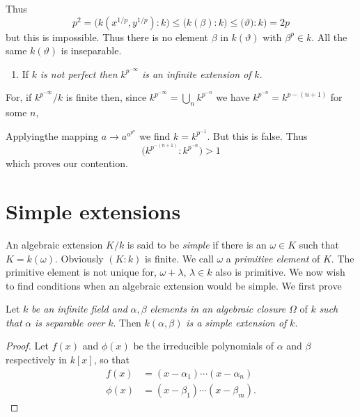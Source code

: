 Thus 
$$
p^2 = \big( k(x^{1/p} , y^{1/p}) : k \big) \le \big( k(\beta) : k \big
) \le \big(\vartheta) : k \big) = 2 p 
$$
but this is impossible. Thus there is no element $\beta$ in $k
(\vartheta)$ with $\beta^p \in k$. All the same $k(\vartheta)$ is
inseparable. 
\begin{enumerate} 
\renewcommand{\labelenumi}{\theenumi)}
\setcounter{enumi}{5}
\item If $k$ \textit {is not perfect then} $k^{p^{-\infty}}$
  \textit{is an infinite extension of} $k$. 
\end{enumerate}

For, if $k^{p^{-\infty}} / k$ is finite then, since $k^{p^{-\infty}} =
\bigcup \limits_{n}k^{p^{- n}}$ we have $k^{p^{- n }} = k^{p - (n +
  1)}$ for some $n$, 

 Applying\pageoriginale the mapping $a \rightarrow a^{a^{p^n}}$
we find $k = k^{p^{-1}}$. But this is false. Thus 
$$
\bigg( k^{p^{-(n+1)}} : k^{p^{-n}} \bigg) > 1
$$
which proves our contention.

\section{Simple extensions}\label{c2:s6}%

An algebraic extension $K/k$ is said to be \textit{simple} if there is
an $\omega \in K$ such that $K = k(\omega)$. Obviously $(K : k)$ is
finite. We call $\omega$ a \textit{primitive element} of $K$. The
primitive element is not unique for, $\omega + \lambda$, $\lambda \in
k$ also is primitive. We now wish to find conditions when an algebraic
extension would be simple. We first prove	 

\begin{lemma*}
Let $k$ {\em be an infinite field and} $\alpha , \beta$ {\em elements
  in an algebraic closure} $\Omega$ of $k$ {\em such that} $\alpha$
{\em is separable over} $k$. Then $k(\alpha , \beta)$ {\em is a simple
  extension of} $k$. 
\end{lemma*}

\begin{proof}
Let $f(x)$ and $\phi (x)$ be the irreducible polynomials of $\alpha$
and $\beta$ respectively in $k[x]$, so that  
\begin{align*}
f(x) & = (x - \alpha_1) \cdots (x - \alpha_n) \\
\phi(x) & = (x - \beta_1) \cdots (x - \beta_m).
\end{align*}
\end{proof}

